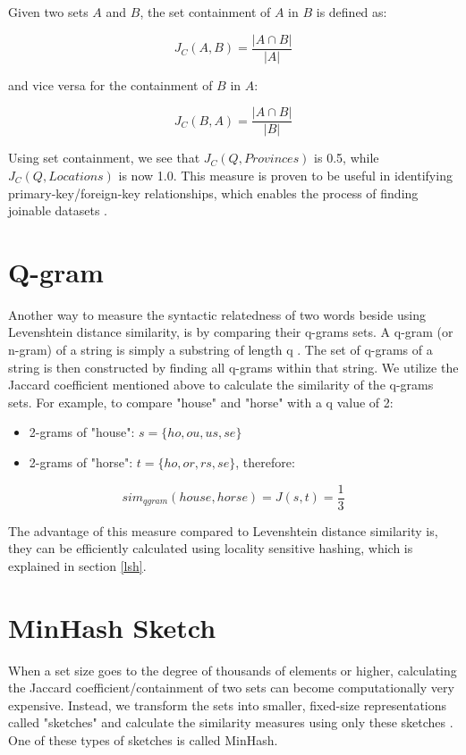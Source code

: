 Given two sets \(A\) and \(B\), the set containment of \(A\) in \(B\) is defined as:

\[
J_C(A, B) = \frac{|A \cap B|}{|A|}
\]

and vice versa for the containment of \(B\) in \(A\):

\[
J_C(B, A) = \frac{|A \cap B|}{|B|}
\]

Using set containment, we see that \(J_C(Q, Provinces)\) is 0.5, while \(J_C(Q, Locations)\) is now 1.0. This measure is proven to be useful in identifying primary-key/foreign-key relationships, which enables the process of finding joinable datasets \cite{lazo}.

\section{Q-gram}

Another way to measure the syntactic relatedness of two words beside using Levenshtein distance similarity, is by comparing their q-grams sets. A q-gram (or n-gram) of a string is simply a substring of length q \cite{qgram}. The set of q-grams of a string is then constructed by finding all q-grams within that string. We utilize the Jaccard coefficient mentioned above to calculate the similarity of the q-grams sets. For example, to compare "house" and "horse" with a q value of 2:

\begin{itemize}
    \item 2-grams of "house": \(s = \{ho, ou, us, se\}\)
    \item 2-grams of "horse": \(t = \{ho, or, rs, se\}\), therefore:
\end{itemize}

\[sim_{qgram}(house, horse) = J(s,t) = \frac{1}{3}\]

The advantage of this measure compared to Levenshtein distance similarity is, they can be efficiently calculated using locality sensitive hashing, which is explained in section \ref{lsh}.

\section{MinHash Sketch}

When a set size goes to the degree of thousands of elements or higher, calculating the Jaccard coefficient/containment of two sets can become computationally very expensive. Instead, we transform the sets into smaller, fixed-size representations called "sketches" and calculate the similarity measures using only these sketches \cite{miningOfMassiveDatasets}. One of these types of sketches is called MinHash.

